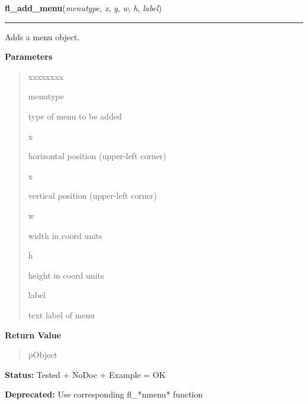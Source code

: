 \hspace{.8\funcindent}\begin{boxedminipage}{\funcwidth}

    \raggedright \textbf{fl\_add\_menu}(\textit{menutype}, \textit{x}, \textit{y}, \textit{w}, \textit{h}, \textit{label})

    \vspace{-1.5ex}

    \rule{\textwidth}{0.5\fboxrule}
\setlength{\parskip}{2ex}
    Adds a menu object.

\setlength{\parskip}{1ex}
      \textbf{Parameters}
      \vspace{-1ex}

      \begin{quote}
        \begin{Ventry}{xxxxxxxx}

          \item[menutype]

          type of menu to be added

          \item[x]

          horizontal position (upper-left corner)

          \item[x]

          vertical position (upper-left corner)

          \item[w]

          width in coord units

          \item[h]

          height in coord units

          \item[label]

          text label of menu

        \end{Ventry}

      \end{quote}

      \textbf{Return Value}
    \vspace{-1ex}

      \begin{quote}
      pObject

      \end{quote}

\textbf{Status:} Tested + NoDoc + Example = OK



\textbf{Deprecated:} Use corresponding fl\_*nmenu* function



    \end{boxedminipage}

